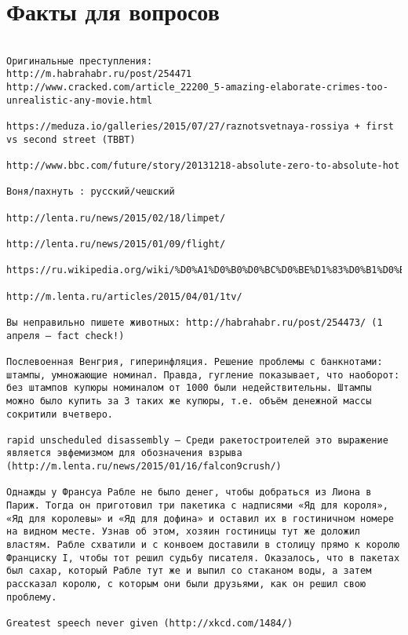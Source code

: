 \documentclass[a4paper,10pt]{article}
\begin{document}
\section{Факты для вопросов}

\begin{verbatim}

Оригинальные преступления:
http://m.habrahabr.ru/post/254471
http://www.cracked.com/article_22200_5-amazing-elaborate-crimes-too-unrealistic-any-movie.html

https://meduza.io/galleries/2015/07/27/raznotsvetnaya-rossiya + first vs second street (TBBT)

http://www.bbc.com/future/story/20131218-absolute-zero-to-absolute-hot

Воня/пахнуть : русский/чешский

http://lenta.ru/news/2015/02/18/limpet/

http://lenta.ru/news/2015/01/09/flight/

https://ru.wikipedia.org/wiki/%D0%A1%D0%B0%D0%BC%D0%BE%D1%83%D0%B1%D0%B8%D0%B9%D1%81%D1%82%D0%B2%D0%BE_%D0%A0%D0%BE%D0%BD%D0%B0%D0%BB%D0%B4%D0%B0_%D0%9E%D0%BF%D1%83%D1%81%D0%B0

http://m.lenta.ru/articles/2015/04/01/1tv/

Вы неправильно пишете животных: http://habrahabr.ru/post/254473/ (1 апреля — fact check!)

Послевоенная Венгрия, гиперинфляция. Решение проблемы с банкнотами: штампы, умножающие номинал. Правда, гугление показывает, что наоборот: без штампов купюры номиналом от 1000 были недействительны. Штампы можно было купить за 3 таких же купюры, т.е. объём денежной массы сокритили вчетверо.

rapid unscheduled disassembly — Среди ракетостроителей это выражение является эвфемизмом для обозначения взрыва (http://m.lenta.ru/news/2015/01/16/falcon9crush/)

Однажды у Франсуа Рабле не было денег, чтобы добраться из Лиона в Париж. Тогда он приготовил три пакетика с надписями «Яд для короля», «Яд для королевы» и «Яд для дофина» и оставил их в гостиничном номере на видном месте. Узнав об этом, хозяин гостиницы тут же доложил властям. Рабле схватили и с конвоем доставили в столицу прямо к королю Франциску I, чтобы тот решил судьбу писателя. Оказалось, что в пакетах был сахар, который Рабле тут же и выпил со стаканом воды, а затем рассказал королю, с которым они были друзьями, как он решил свою проблему.

Greatest speech never given (http://xkcd.com/1484/)
\end{verbatim}
\end{document}
